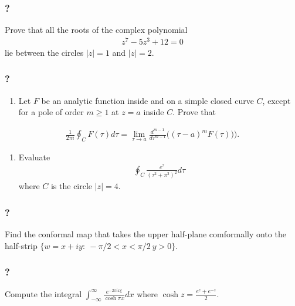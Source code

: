 \hypertarget{section-195}{%
\subsubsection{?}\label{section-195}}

Prove that all the roots of the complex polynomial
\begin{align*}z^7 - 5 z^3 +12 =0\end{align*}
lie between the circles \(|z|=1\) and \(|z|=2\).

\hypertarget{section-196}{%
\subsubsection{?}\label{section-196}}

\begin{enumerate}
\def\labelenumi{(\alph{enumi})}
\tightlist
\item
  Let \(F\) be an analytic function inside and on a simple closed curve
  \(C\), except for a pole of order \(m\geq 1\) at \(z=a\) inside \(C\).
  Prove that
\end{enumerate}

\begin{align*}\frac{1}{2 \pi i}\oint_{C} F(\tau) d\tau = 
\lim_{\tau\rightarrow a} \frac{d^{m-1}}{d\tau^{m-1}}\big((\tau-a)^m F(\tau))\big).\end{align*}

\begin{enumerate}
\def\labelenumi{(\alph{enumi})}
\setcounter{enumi}{1}
\tightlist
\item
  Evaluate
  \begin{align*}\oint_{C}\frac{e^{\tau}}{(\tau^2+\pi^2)^2}d\tau\end{align*}
  where \(C\) is the circle \(|z|=4\).
\end{enumerate}

\hypertarget{section-197}{%
\subsubsection{?}\label{section-197}}

Find the conformal map that takes the upper half-plane comformally onto
the half-strip \(\{ w=x+iy:\ -\pi/2<x<\pi/2\ y>0\}\).

\hypertarget{section-198}{%
\subsubsection{?}\label{section-198}}

Compute the integral
\(\displaystyle{\int_{-\infty}^{\infty} \frac{e^{-2\pi ix\xi}}{\cosh\pi x}dx}\)
where \(\displaystyle{\cosh z=\frac{e^{z}+e^{-z}}{2}}\).


\printbibliography[title=Bibliography]



